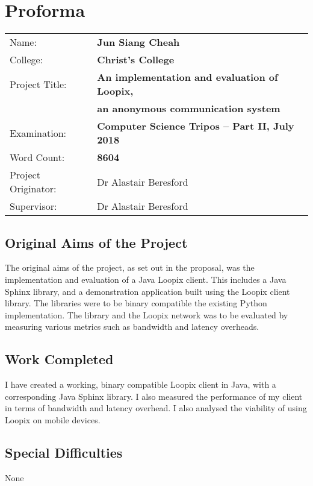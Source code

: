\documentclass[final,dissertation.tex]{subfiles}
\begin{document}
\pagestyle{plain}

\chapter*{Proforma}

{\large
	\begin{tabular}{ll}
		Name:               & \bf Jun Siang Cheah                               \\
		College:            & \bf Christ's College                              \\
		Project Title:      & \bf An implementation and evaluation of Loopix,   \\ 
		& \bf an anonymous communication system                                 \\
		Examination:        & \bf Computer Science Tripos -- Part II, July 2018 \\
		Word Count:         & \bf 8604\footnotemark                              \\
		Project Originator: & Dr Alastair Beresford                             \\
		Supervisor:         & Dr Alastair Beresford                             \\ 
	\end{tabular}
}


\section*{Original Aims of the Project}

The original aims of the project, as set out in the proposal, was the implementation and evaluation of a Java Loopix client. This includes a Java Sphinx library, and a demonstration application built using the Loopix client library. The libraries were to be binary compatible the existing Python implementation. The library and the Loopix network was to be evaluated by measuring various metrics such as bandwidth and latency overheads.

\section*{Work Completed}

I have created a working, binary compatible Loopix client in Java, with a corresponding Java Sphinx library. I also measured the performance of my client in terms of bandwidth and latency overhead. I also analysed the viability of using Loopix on mobile devices.

\section*{Special Difficulties}

None
\end{document}
